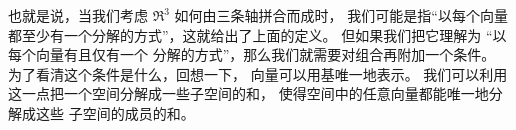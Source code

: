 



也就是说，当我们考虑 $\Re^3$ 如何由三条轴拼合而成时，
我们可能是指“以每个向量
都至少有一个分解的方式”，这就给出了上面的定义。
但如果我们把它理解为
“以每个向量有且仅有一个
分解的方式”，那么我们就需要对组合再附加一个条件。
为了看清这个条件是什么，回想一下，
向量可以用基唯一地表示。
我们可以利用这一点把一个空间分解成一些子空间的和，
使得空间中的任意向量都能唯一地分解成这些
子空间的成员的和。

